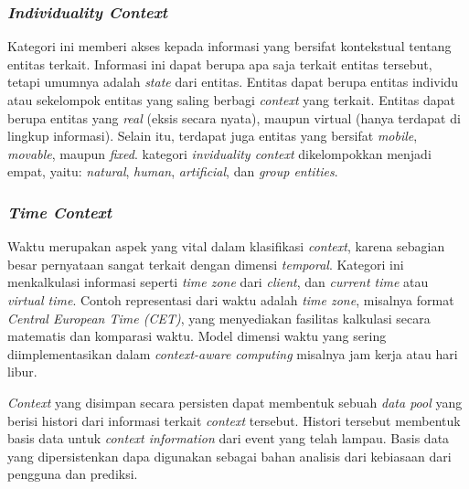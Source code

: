 \subsubsection{\textit{Individuality Context}}
\label{sssec:individuality-context}
Kategori ini memberi akses kepada informasi yang bersifat kontekstual tentang entitas terkait. Informasi ini dapat berupa apa saja terkait entitas tersebut, tetapi umumnya adalah \textit{state} dari entitas. Entitas dapat berupa entitas individu atau sekelompok entitas yang saling berbagi \textit{context} yang terkait. Entitas dapat berupa entitas yang \textit{real} (eksis secara nyata), maupun virtual (hanya terdapat di lingkup informasi). Selain itu, terdapat juga entitas yang bersifat \textit{mobile}, \textit{movable}, maupun \textit{fixed}. kategori \textit{inviduality context} dikelompokkan menjadi empat, yaitu: \textit{natural}, \textit{human}, \textit{artificial}, dan \textit{group entities}.


\subsubsection{\textit{Time Context}}
\label{sssec:time-context}
Waktu merupakan aspek yang vital dalam klasifikasi \textit{context}, karena sebagian besar pernyataan sangat terkait dengan dimensi \textit{temporal}. Kategori ini menkalkulasi informasi seperti \textit{time zone} dari \textit{client}, dan \textit{current time} atau \textit{virtual time}. Contoh representasi dari waktu adalah \textit{time zone}, misalnya format \textit{ Central European Time (CET)}, yang menyediakan fasilitas kalkulasi secara matematis dan komparasi waktu. Model dimensi waktu yang sering diimplementasikan dalam \textit{context-aware computing} misalnya jam kerja atau hari libur.


\textit{Context} yang disimpan secara persisten dapat membentuk sebuah \textit{data pool} yang berisi histori dari informasi terkait \textit{context} tersebut. Histori tersebut membentuk basis data untuk \textit{context information} dari event yang telah lampau. Basis data yang dipersistenkan dapa digunakan sebagai bahan analisis dari kebiasaan dari pengguna dan prediksi.


